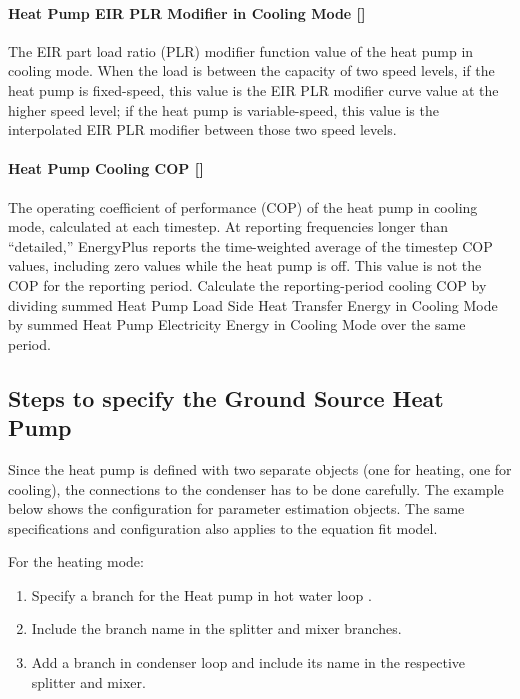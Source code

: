 \paragraph{Heat Pump EIR PLR Modifier in Cooling Mode {[}{]}}
The EIR part load ratio (PLR) modifier function value of the heat pump in cooling
mode. When the load is between the capacity of two speed levels, if the heat
pump is fixed-speed, this value is the EIR PLR modifier curve value
at the higher speed level; if the heat pump is variable-speed, this value is the
interpolated EIR PLR modifier between those two speed levels.
\paragraph{Heat Pump Cooling COP {[}{]}} The operating coefficient of performance
(COP) of the heat pump in cooling mode, calculated at each timestep.
At reporting frequencies longer than ``detailed,'' EnergyPlus reports the
time-weighted average of the timestep COP values, including zero values while
the heat pump is off. This value is not the COP for the reporting period. Calculate
the reporting-period cooling COP by dividing summed Heat Pump Load Side Heat
Transfer Energy in Cooling Mode by summed Heat Pump Electricity Energy in Cooling
Mode over the same period.

\subsection{Steps to specify the Ground Source Heat Pump}\label{steps-to-specify-the-ground-source-heat-pump}

Since the heat pump is defined with two separate objects (one for heating, one for cooling), the connections to the condenser has to be done carefully. The example below shows the configuration for parameter estimation objects. The same specifications and configuration also applies to the equation fit model.

For the heating mode:

\begin{enumerate}
    \def\labelenumi{\arabic{enumi}.}
    \item
    Specify a branch for the Heat pump in hot water loop .
    \item
    Include the branch name in the splitter and mixer branches.
    \item
    Add a branch in condenser loop and include its name in the respective splitter and mixer.
\end{enumerate}

